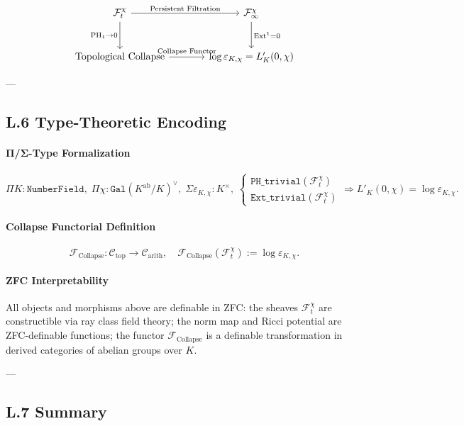 \documentclass[11pt]{article}
\begin{document}
\[
\begin{tikzcd}[row sep=large, column sep=large]
\mathcal{F}^\chi_t \arrow[r, "\text{Persistent Filtration}"] \arrow[d, "\mathrm{PH}_1 \to 0"'] 
& \mathcal{F}^\chi_\infty \arrow[d, "\mathrm{Ext}^1 = 0"] \\
\text{Topological Collapse} \arrow[r, "\text{Collapse Functor}"] 
& \log \varepsilon_{K,\chi} = L'_K(0,\chi)
\end{tikzcd}
\]

---

\subsection*{L.6 Type-Theoretic Encoding}

\paragraph{Π/Σ-Type Formalization}

\[
\Pi K : \texttt{NumberField}, \;
\Pi \chi : \texttt{Gal}(K^{\text{ab}}/K)^\vee, \;
\Sigma \varepsilon_{K,\chi} : K^\times, \;
\begin{cases}
\texttt{PH\_trivial}(\mathcal{F}^\chi_t) \\
\texttt{Ext\_trivial}(\mathcal{F}^\chi_t)
\end{cases}
\Rightarrow
L'_K(0,\chi) = \log \varepsilon_{K,\chi}.
\]

\paragraph{Collapse Functorial Definition}

\[
\mathcal{F}_{\mathrm{Collapse}} : \mathcal{C}_{\mathrm{top}} \to \mathcal{C}_{\mathrm{arith}},
\quad
\mathcal{F}_{\mathrm{Collapse}}(\mathcal{F}_t^\chi) := \log \varepsilon_{K,\chi}.
\]

\paragraph{ZFC Interpretability}

All objects and morphisms above are definable in ZFC: the sheaves $\mathcal{F}^\chi_t$ are constructible via ray class field theory; the norm map and Ricci potential are ZFC-definable functions; the functor $\mathcal{F}_{\mathrm{Collapse}}$ is a definable transformation in derived categories of abelian groups over $K$.

---

\subsection*{L.7 Summary}
\end{document}
